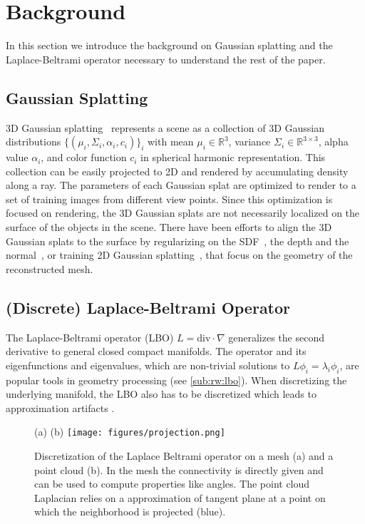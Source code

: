 \section{Background}
\label{sec:background}

In this section we introduce the background on Gaussian splatting and the Laplace-Beltrami operator necessary to understand the rest of the paper. 

\subsection{Gaussian Splatting} \label{sub:bg:gaussian}

3D Gaussian splatting~\cite{kerbl3Dgaussians} represents a scene as a collection of 3D Gaussian distributions $\{ (\mu_i, \Sigma_i, \alpha_i, c_i) \}_i$ with mean $\mu_i \in \mathbb{R}^3$, variance $\Sigma_i \in \mathbb{R}^{3 \times 3}$, alpha value $\alpha_i$, and color function $c_i$ in spherical harmonic representation. 
This collection can be easily projected to 2D and rendered by accumulating density along a ray. 
The parameters of each Gaussian splat are optimized to render to a set of training images from different view points. 
Since this optimization is focused on rendering, the 3D Gaussian splats are not necessarily localized on the surface of the objects in the scene. 
There have been efforts to align the 3D Gaussian splats to the surface by regularizing on the SDF~\cite{guedon2023sugar}, the depth and the normal~\cite{yu2024gaussian}, or training 2D Gaussian splatting~\cite{Huang2DGS2024}, that focus on the geometry of the reconstructed mesh.

\subsection{(Discrete) Laplace-Beltrami Operator} \label{sub:bg:lbo}

The Laplace-Beltrami operator (LBO) $L = \text{div}\cdot \nabla$ generalizes the second derivative to general closed compact manifolds. 
The operator and its eigenfunctions and eigenvalues, which are non-trivial solutions to $L \phi_i = \lambda_i \phi_i$, are popular tools in geometry processing (see \cref{sub:rw:lbo}). 
When discretizing the underlying manifold, the LBO also has to be discretized which leads to approximation artifacts \cite{wardetzky2007nofreelunch}. 

\begin{figure}
    \centering
    (a) 
    (b) \texttt{[image: figures/projection.png]}
    \caption{Discretization of the Laplace Beltrami operator on a mesh (a) and a point cloud (b). In the mesh the connectivity is directly given and can be used to compute properties like angles. The point cloud Laplacian relies on a approximation of tangent plane at a point on which the neighborhood is projected (blue). }
    \label{fig:cotan}
\end{figure}

